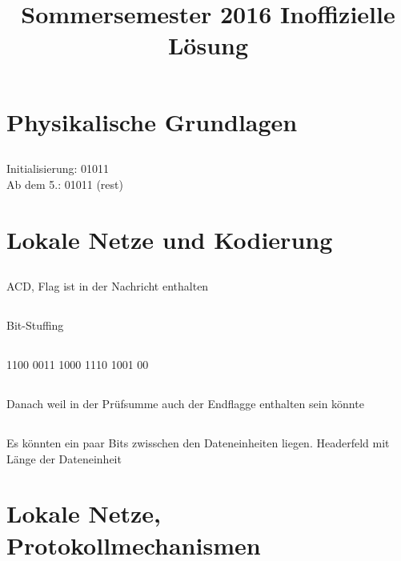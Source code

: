 \documentclass[a4paper]{article}
\title{Sommersemester 2016 Inoffizielle Lösung}
\begin{document}
\section{Physikalische Grundlagen}
\subsection{}
\subsection{}
\subsection{}
\subsection{}
\subsection{}
Initialisierung: 01011 \\
Ab dem 5.: 01011 (rest)
\section{Lokale Netze und Kodierung}
\subsection{}
ACD, Flag ist in der Nachricht enthalten
\subsection{}
Bit-Stuffing
\subsection{}
1100 0011 1000 1110 1001 00
\subsection{}
Danach weil in der Prüfsumme auch der Endflagge enthalten sein könnte
\subsection{}
Es könnten ein paar Bits zwisschen den Dateneinheiten liegen.
Headerfeld mit Länge der Dateneinheit
\section{Lokale Netze, Protokollmechanismen}
\end{document}
